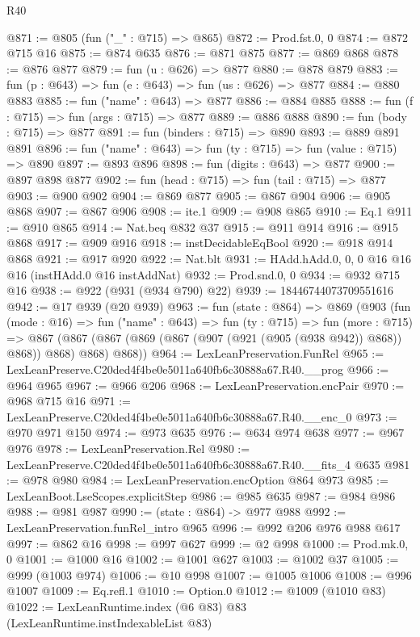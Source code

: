 \begin{lexlean}{R40}
\begin{coremodule}
@871 := @805 (fun ("_" : @715) => @865)
@872 := Prod.fst.{0, 0}
@874 := @872 @715 @16
@875 := @874 @635
@876 := @871 @875
@877 := @869 @868
@878 := @876 @877
@879 := fun (u : @626) => @877
@880 := @878 @879
@883 := fun (p : @643) => fun (e : @643) => fun (us : @626) => @877
@884 := @880 @883
@885 := fun ("name" : @643) => @877
@886 := @884 @885
@888 := fun (f : @715) => fun (args : @715) => @877
@889 := @886 @888
@890 := fun (body : @715) => @877
@891 := fun (binders : @715) => @890
@893 := @889 @891 @891
@896 := fun ("name" : @643) => fun (ty : @715) => fun (value : @715) => @890
@897 := @893 @896
@898 := fun (digits : @643) => @877
@900 := @897 @898 @877
@902 := fun (head : @715) => fun (tail : @715) => @877
@903 := @900 @902
@904 := @869 @877
@905 := @867 @904
@906 := @905 @868
@907 := @867 @906
@908 := ite.{1}
@909 := @908 @865
@910 := Eq.{1}
@911 := @910 @865
@914 := Nat.beq @832 @37
@915 := @911 @914
@916 := @915 @868
@917 := @909 @916
@918 := instDecidableEqBool
@920 := @918 @914 @868
@921 := @917 @920
@922 := Nat.blt
@931 := HAdd.hAdd.{0, 0, 0} @16 @16 @16 (instHAdd.{0} @16 instAddNat)
@932 := Prod.snd.{0, 0}
@934 := @932 @715 @16
@938 := @922 (@931 (@934 @790) @22)
@939 := 18446744073709551616
@942 := @17 @939 (@20 @939)
@963 := fun (state : @864) =>
  @869
    (@903
      (fun (mode : @16) =>
      fun ("name" : @643) =>
      fun (ty : @715) =>
      fun (more : @715) =>
      @867 (@867 (@867 (@869 (@867 (@907 (@921 (@905 (@938 @942)) @868)) @868)) @868) @868) @868))
@964 := LexLeanPreservation.FunRel
@965 := LexLeanPreserve.C20ded4f4be0e5011a640fb6c30888a67.R40.__prog
@966 := @964 @965
@967 := @966 @206
@968 := LexLeanPreservation.encPair
@970 := @968 @715 @16
@971 := LexLeanPreserve.C20ded4f4be0e5011a640fb6c30888a67.R40.__enc_0
@973 := @970 @971 @150
@974 := @973 @635
@976 := @634 @974 @638
@977 := @967 @976
@978 := LexLeanPreservation.Rel
@980 := LexLeanPreserve.C20ded4f4be0e5011a640fb6c30888a67.R40.__fits_4 @635
@981 := @978 @980
@984 := LexLeanPreservation.encOption @864 @973
@985 := LexLeanBoot.LseScopes.explicitStep
@986 := @985 @635
@987 := @984 @986
@988 := @981 @987
@990 := (state : @864) -> @977 @988
@992 := LexLeanPreservation.funRel_intro @965
@996 := @992 @206 @976 @988 @617
@997 := @862 @16
@998 := @997 @627
@999 := @2 @998
@1000 := Prod.mk.{0, 0}
@1001 := @1000 @16
@1002 := @1001 @627
@1003 := @1002 @37
@1005 := @999 (@1003 @974)
@1006 := @10 @998
@1007 := @1005 @1006
@1008 := @996 @1007
@1009 := Eq.refl.{1}
@1010 := Option.{0}
@1012 := @1009 (@1010 @83)
@1022 := LexLeanRuntime.index
    (@6 @83)
    @83
    (LexLeanRuntime.instIndexableList @83)

\end{coremodule}
\end{lexlean}
